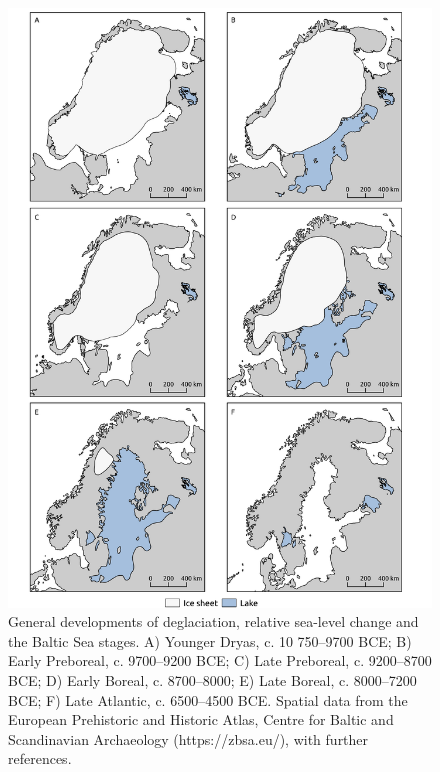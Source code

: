 \documentclass[
  a4paper,
  oneside]{uiophdthesis}
\begin{document}
\begin{figure}

{\centering \includegraphics[width=1.05\linewidth,height=1.05\textheight]{figures/palaeo-maps} 

}

\caption{General developments of deglaciation, relative sea-level change and the Baltic Sea stages. A) Younger Dryas, c. 10 750--9700 BCE; B) Early Preboreal, c. 9700--9200 BCE; C) Late Preboreal, c. 9200--8700 BCE; D) Early Boreal, c. 8700--8000; E) Late Boreal, c. 8000--7200 BCE; F) Late Atlantic, c. 6500--4500 BCE. Spatial data from the European Prehistoric and Historic Atlas, Centre for Baltic and Scandinavian Archaeology (https://zbsa.eu/), with further references.}\label{fig:palaeo-maps}
\end{figure}
\end{document}
